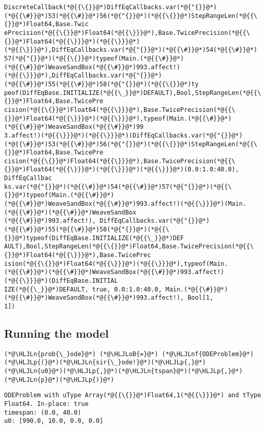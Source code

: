 \documentclass[12pt,a4paper]{article}
\newcommand{\HLJLn}[1]{#1}
\newcommand{\HLJLnf}[1]{\textcolor[RGB]{66,102,213}{#1}}
\newcommand{\HLJLoB}[1]{\textcolor[RGB]{102,102,102}{\textbf{#1}}}
\newcommand{\HLJLp}[1]{#1}
\begin{document}
\begin{lstlisting}
DiscreteCallback(*@{{\{}}@*)DiffEqCallbacks.var(*@{"{}}@*)(*@{{\#}}@*)53(*@{{\#}}@*)56(*@{"{}}@*)(*@{{\{}}@*)StepRangeLen(*@{{\{}}@*)Float64,Base.Twic
ePrecision(*@{{\{}}@*)Float64(*@{{\}}}@*),Base.TwicePrecision(*@{{\{}}@*)Float64(*@{{\}}}@*)(*@{{\}}}@*)(*@{{\}}}@*),DiffEqCallbacks.var(*@{"{}}@*)(*@{{\#}}@*)54(*@{{\#}}@*)
57(*@{"{}}@*)(*@{{\{}}@*)typeof(Main.(*@{{\#}}@*)(*@{{\#}}@*)WeaveSandBox(*@{{\#}}@*)993.affect!)(*@{{\}}}@*),DiffEqCallbacks.var(*@{"{}}@*)(*@{{\#}}@*)55(*@{{\#}}@*)58(*@{"{}}@*)(*@{{\{}}@*)ty
peof(DiffEqBase.INITIALIZE(*@{{\_}}@*)DEFAULT),Bool,StepRangeLen(*@{{\{}}@*)Float64,Base.TwicePre
cision(*@{{\{}}@*)Float64(*@{{\}}}@*),Base.TwicePrecision(*@{{\{}}@*)Float64(*@{{\}}}@*)(*@{{\}}}@*),typeof(Main.(*@{{\#}}@*)(*@{{\#}}@*)WeaveSandBox(*@{{\#}}@*)99
3.affect!)(*@{{\}}}@*)(*@{{\}}}@*)(DiffEqCallbacks.var(*@{"{}}@*)(*@{{\#}}@*)53(*@{{\#}}@*)56(*@{"{}}@*)(*@{{\{}}@*)StepRangeLen(*@{{\{}}@*)Float64,Base.TwicePre
cision(*@{{\{}}@*)Float64(*@{{\}}}@*),Base.TwicePrecision(*@{{\{}}@*)Float64(*@{{\}}}@*)(*@{{\}}}@*)(*@{{\}}}@*)(0.0:1.0:40.0), DiffEqCallbac
ks.var(*@{"{}}@*)(*@{{\#}}@*)54(*@{{\#}}@*)57(*@{"{}}@*)(*@{{\{}}@*)typeof(Main.(*@{{\#}}@*)(*@{{\#}}@*)WeaveSandBox(*@{{\#}}@*)993.affect!)(*@{{\}}}@*)(Main.(*@{{\#}}@*)(*@{{\#}}@*)WeaveSandBox
(*@{{\#}}@*)993.affect!), DiffEqCallbacks.var(*@{"{}}@*)(*@{{\#}}@*)55(*@{{\#}}@*)58(*@{"{}}@*)(*@{{\{}}@*)typeof(DiffEqBase.INITIALIZE(*@{{\_}}@*)DEF
AULT),Bool,StepRangeLen(*@{{\{}}@*)Float64,Base.TwicePrecision(*@{{\{}}@*)Float64(*@{{\}}}@*),Base.TwicePrec
ision(*@{{\{}}@*)Float64(*@{{\}}}@*)(*@{{\}}}@*),typeof(Main.(*@{{\#}}@*)(*@{{\#}}@*)WeaveSandBox(*@{{\#}}@*)993.affect!)(*@{{\}}}@*)(DiffEqBase.INITIAL
IZE(*@{{\_}}@*)DEFAULT, true, 0.0:1.0:40.0, Main.(*@{{\#}}@*)(*@{{\#}}@*)WeaveSandBox(*@{{\#}}@*)993.affect!), Bool[1, 
1])
\end{lstlisting}


\subsection{Running the model}

\begin{lstlisting}
(*@\HLJLn{prob{\_}ode}@*) (*@\HLJLoB{=}@*) (*@\HLJLnf{ODEProblem}@*)(*@\HLJLp{(}@*)(*@\HLJLn{sir{\_}ode!}@*)(*@\HLJLp{,}@*)(*@\HLJLn{u0}@*)(*@\HLJLp{,}@*)(*@\HLJLn{tspan}@*)(*@\HLJLp{,}@*)(*@\HLJLn{p}@*)(*@\HLJLp{)}@*)
\end{lstlisting}

\begin{lstlisting}
ODEProblem with uType Array(*@{{\{}}@*)Float64,1(*@{{\}}}@*) and tType Float64. In-place: true
timespan: (0.0, 40.0)
u0: [990.0, 10.0, 0.0, 0.0]
\end{lstlisting}
\end{document}
